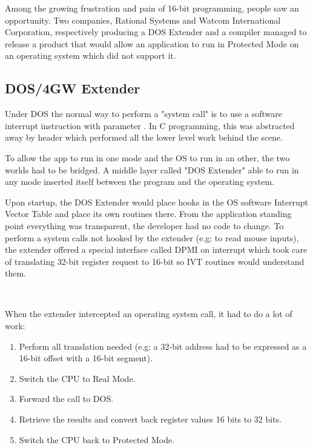 \par
Among the growing frustration and pain of 16-bit programming, people saw an opportunity. Two companies, Rational Systems and Watcom International Corporation, respectively producing a DOS Extender and a compiler managed to release a product that would allow an application to run in Protected Mode on an operating system which did not support it.\\
\par


\subsection{DOS/4GW Extender}
Under DOS the normal way to perform a "system call" is to use a software interrupt instruction with parameter . In C programming, this was abstracted away by header  which performed all the lower level work behind the scene.\\
\par
{}
To allow the app to run in one mode and the OS to run in an other, the two worlds had to be bridged. A middle layer called "DOS Extender" able to run in any mode inserted itself between the program and the operating system.\\

\par
{}
Upon startup, the DOS Extender would place hooks in the OS software Interrupt Vector Table and place its own routines there. From the application standing point everything was transparent, the developer had no code to change. To perform a system calls not hooked by the extender (e.g:  to read mouse inputs), the extender offered a special interface called DPMI on interrupt  which took care of translating 32-bit register request to 16-bit so IVT routines would understand them.\\
\par
{}\\
\par
When the extender intercepted an operating system call, it had to do a lot of work:
\begin{enumerate}
\item Perform all translation needed (e.g: a 32-bit address had to be expressed as a 16-bit offset with a 16-bit segment).
\item Switch the CPU to Real Mode.
\item Forward the call to DOS.
\item Retrieve the results and convert back register values 16 bits to 32 bits.
\item Switch the CPU back to Protected Mode.
\end{enumerate} 


